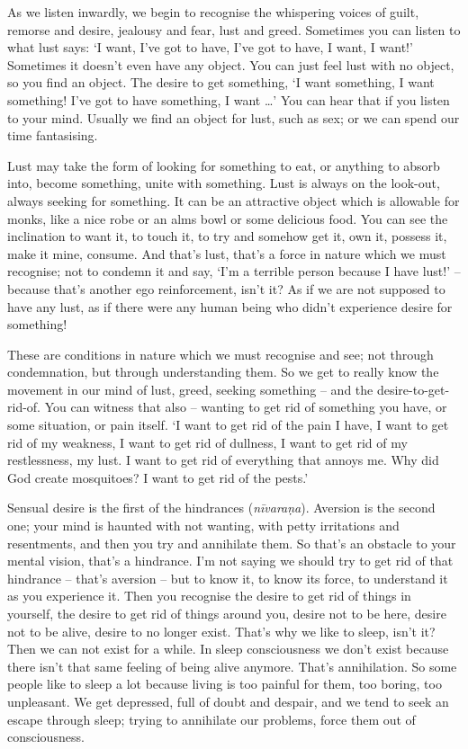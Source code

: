 
As we listen inwardly, we begin to recognise the whispering voices of guilt, remorse and desire, jealousy and fear, lust and greed. Sometimes you can listen to what lust says: `I want, I've got to have, I've got to have, I want, I want!' Sometimes it doesn't even have any object. You can just feel lust with no object, so you find an object. The desire to get something, `I want something, I want something! I've got to have something, I want \ldots{}' You can hear that if you listen to your mind. Usually we find an object for lust, such as sex; or we can spend our time fantasising.

Lust may take the form of looking for something to eat, or anything to absorb into, become something, unite with something. Lust is always on the look-out, always seeking for something. It can be an attractive object which is allowable for monks, like a nice robe or an alms bowl or some delicious food. You can see the inclination to want it, to touch it, to try and somehow get it, own it, possess it, make it mine, consume. And that's lust, that's a force in nature which we must recognise; not to condemn it and say, `I'm a terrible person because I have lust!' -- because that's another ego reinforcement, isn't it? As if we are not supposed to have any lust, as if there were any human being who didn't experience desire for something!

These are conditions in nature which we must recognise and see; not through condemnation, but through understanding them. So we get to really know the movement in our mind of lust, greed, seeking something -- and the desire-to-get-rid-of. You can witness that also -- wanting to get rid of something you have, or some situation, or pain itself. `I want to get rid of the pain I have, I want to get rid of my weakness, I want to get rid of dullness, I want to get rid of my restlessness, my lust. I want to get rid of everything that annoys me. Why did God create mosquitoes? I want to get rid of the pests.' 

Sensual desire is the first of the hindrances (\textit{nīvaraṇa}). Aversion is the second one; your mind is haunted with not wanting, with petty irritations and resentments, and then you try and annihilate them. So that's an obstacle to your mental vision, that's a hindrance. I'm not saying we should try to get rid of that hindrance -- that's aversion -- but to know it, to know its force, to understand it as you experience it. Then you recognise the desire to get rid of things in yourself, the desire to get rid of things around you, desire not to be here, desire not to be alive, desire to no longer exist. That's why we like to sleep, isn't it? Then we can not exist for a while. In sleep consciousness we don't exist because there isn't that same feeling of being alive anymore. That's annihilation. So some people like to sleep a lot because living is too painful for them, too boring, too unpleasant. We get depressed, full of doubt and despair, and we tend to seek an escape through sleep; trying to annihilate our problems, force them out of consciousness.

